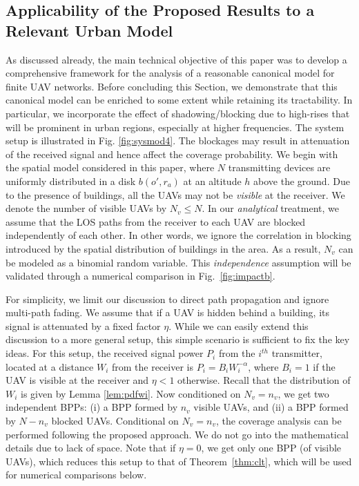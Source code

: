 \documentclass[journal,draftclsnofoot,onecolumn,12pt]{IEEEtran}
\begin{document}
\subsection{Applicability of the Proposed Results to a Relevant Urban Model}
As discussed already, the main technical objective of this paper was to develop a comprehensive framework for the analysis of a reasonable canonical model for finite UAV networks. Before concluding this Section, we demonstrate that this canonical model can be enriched to some extent while retaining its tractability. In particular, we incorporate the effect of shadowing/blocking due to high-rises that will be prominent in urban regions, especially at higher frequencies. The system setup is illustrated in Fig. \ref{fig:sysmod4}. The blockages may result in attenuation of the received signal and hence affect the coverage probability. We begin with the spatial model considered in this paper, where $N$ transmitting devices are uniformly distributed in a disk $b(o',r_a)$ at an altitude $h$ above the ground. Due to the presence of buildings, all the UAVs may not be {\em visible} at the receiver. We denote the number of visible UAVs by $N_v \leq N$. In our {\em analytical} treatment, we assume that the LOS paths from the receiver to each UAV are blocked independently of each other. In other words, we ignore the correlation in blocking introduced by the spatial distribution of buildings in the area. As a result, $N_v$ can be modeled as a binomial random variable. This {\em independence} assumption will be validated through a numerical comparison in Fig.~\ref{fig:impactb}. 

For simplicity, we limit our discussion to direct path propagation and ignore multi-path fading. We assume that if a UAV is hidden behind a building, its signal is attenuated by a fixed factor $\eta$. While we can easily extend this discussion to a more general setup, this simple scenario is sufficient to fix the key ideas. For this setup, the received signal power $P_i$ from the $i^{th}$ transmitter, located at a distance $W_i$ from the receiver is
$P_i = B_i W_i^{-\alpha}$, 
where $B_i = 1$ if the UAV is visible at the receiver and $\eta < 1$ otherwise. Recall that the distribution of $W_i$ is given by Lemma \ref{lem:pdfwi}. Now conditioned on $N_v = n_v$, we get two independent BPPs: (i) a BPP formed by $n_v$ visible UAVs, and (ii) a BPP formed by $N-n_v$ blocked UAVs. Conditional on $N_v = n_v$, the coverage analysis can be performed following the proposed approach. We do not go into the mathematical details due to lack of space. Note that if $\eta=0$, we get only one BPP (of visible UAVs), which reduces this setup to that of Theorem~\ref{thm:clt}, which will be used for numerical comparisons below.
\end{document}
